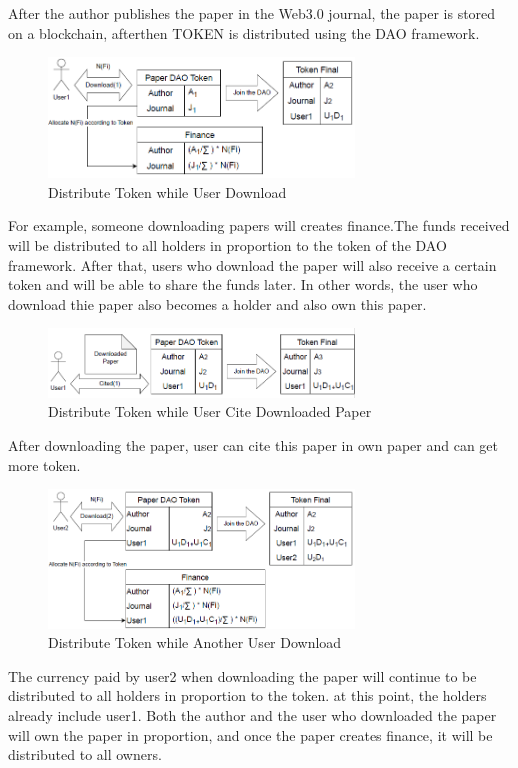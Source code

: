 \documentclass[lettersize,journal]{IEEEtran}
\begin{document}
After the author publishes the paper in the Web3.0 journal, the paper is stored on a blockchain, afterthen TOKEN is distributed using the DAO framework.


\begin{figure}[h]
  \centering
  \includegraphics[width=3.2in]{assets/download1.png}
  \caption{Distribute Token while User Download}
\end{figure}


For example, someone downloading papers will creates finance.The funds received will be distributed to all holders in proportion to the token of the DAO framework. After that, users who download the paper will also receive a certain token and will be able to share the funds later. In other words, the user who download thie paper also becomes a holder and also own this paper.


\begin{figure}[h]
  \centering
  \includegraphics[width=3.2in]{assets/cite1.png}
  \caption{Distribute Token while User Cite Downloaded Paper}
\end{figure}


After downloading the paper, user can cite this paper in own paper and can get more token.


\begin{figure}[h]
  \centering
  \includegraphics[width=3.2in]{assets/donwload2.png}
  \caption{Distribute Token while Another User Download}
\end{figure}


The currency paid by user2 when downloading the paper will continue to be distributed to all holders in proportion to the token. at this point, the holders already include user1. Both the author and the user who downloaded the paper will own the paper in proportion, and once the paper creates finance, it will be distributed to all owners.
\end{document}
